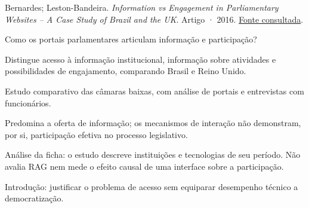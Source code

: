 {\small Bernardes; Leston-Bandeira. \textit{Information vs Engagement in Parliamentary Websites -- A Case Study of Brazil and the UK}. Artigo · 2016. \href{https://revistas.ufpr.br/rsp/article/download/48709/29300}{Fonte consultada}.\par}

Como os portais parlamentares articulam informação e participação?

Distingue acesso à informação institucional, informação sobre atividades e possibilidades de engajamento, comparando Brasil e Reino Unido.

Estudo comparativo das câmaras baixas, com análise de portais e entrevistas com funcionários.

Predomina a oferta de informação; os mecanismos de interação não demonstram, por si, participação efetiva no processo legislativo.

\begin{itemize}
\end{itemize}

Análise da ficha: o estudo descreve instituições e tecnologias de seu período. Não avalia RAG nem mede o efeito causal de uma interface sobre a participação.

Introdução: justificar o problema de acesso sem equiparar desempenho técnico a democratização.

